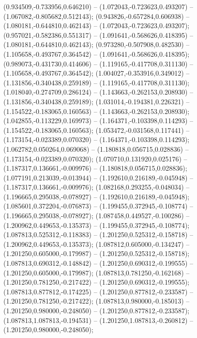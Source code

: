  (0.934509,-0.733956,0.646210) -- (1.072043,-0.723623,0.493207) -- (1.067082,-0.805682,0.512143);
 (0.943826,-0.657284,0.606938) -- (1.080181,-0.644810,0.462143) -- (1.072043,-0.723623,0.493207);
 (0.957021,-0.582386,0.551317) -- (1.091641,-0.568626,0.418395) -- (1.080181,-0.644810,0.462143);
 (0.973280,-0.507908,0.482530) -- (1.105658,-0.493767,0.364542) -- (1.091641,-0.568626,0.418395);
 (0.989073,-0.431730,0.414606) -- (1.119165,-0.417708,0.311130) -- (1.105658,-0.493767,0.364542);
 (1.004027,-0.353916,0.349012) -- (1.131856,-0.340438,0.259189) -- (1.119165,-0.417708,0.311130);
 (1.018040,-0.274709,0.286124) -- (1.143663,-0.262153,0.208930) -- (1.131856,-0.340438,0.259189);
 (1.031014,-0.194381,0.226321) -- (1.154522,-0.183065,0.160563) -- (1.143663,-0.262153,0.208930);
 (1.042855,-0.113229,0.169973) -- (1.164371,-0.103398,0.114293) -- (1.154522,-0.183065,0.160563);
 (1.053472,-0.031568,0.117441) -- (1.173154,-0.023389,0.070320) -- (1.164371,-0.103398,0.114293);
 (1.062782,0.050264,0.069068) -- (1.180818,0.056715,0.028836) -- (1.173154,-0.023389,0.070320);
 (1.070710,0.131920,0.025176) -- (1.187317,0.136661,-0.009976) -- (1.180818,0.056715,0.028836);
 (1.077191,0.213039,-0.013944) -- (1.192610,0.216189,-0.045948) -- (1.187317,0.136661,-0.009976);
 (1.082168,0.293255,-0.048034) -- (1.196665,0.295038,-0.078927) -- (1.192610,0.216189,-0.045948);
 (1.085601,0.372204,-0.076873) -- (1.199455,0.372945,-0.108774) -- (1.196665,0.295038,-0.078927);
 (1.087458,0.449527,-0.100286) -- (1.200962,0.449653,-0.135373) -- (1.199455,0.372945,-0.108774);
 (1.087813,0.525312,-0.118383) -- (1.201250,0.525312,-0.158718) -- (1.200962,0.449653,-0.135373);
 (1.087812,0.605000,-0.134247) -- (1.201250,0.605000,-0.179987) -- (1.201250,0.525312,-0.158718);
 (1.087813,0.690312,-0.148842) -- (1.201250,0.690312,-0.199555) -- (1.201250,0.605000,-0.179987);
 (1.087813,0.781250,-0.162168) -- (1.201250,0.781250,-0.217422) -- (1.201250,0.690312,-0.199555);
 (1.087813,0.877812,-0.174225) -- (1.201250,0.877812,-0.233587) -- (1.201250,0.781250,-0.217422);
 (1.087813,0.980000,-0.185013) -- (1.201250,0.980000,-0.248050) -- (1.201250,0.877812,-0.233587);
 (1.087813,1.087813,-0.194531) -- (1.201250,1.087813,-0.260812) -- (1.201250,0.980000,-0.248050);
